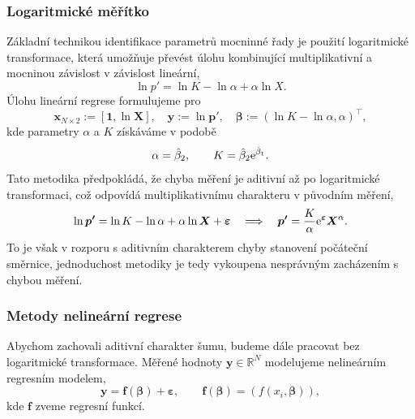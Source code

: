 \subsubsection{Logaritmické měřítko}\label{sss:logaritmicke_meritko}
Základní technikou identifikace parametrů mocninné řady je použití logaritmické transformace, která umožňuje převést úlohu kombinující multiplikativní a mocninou závislost v závislost lineární,
\begin{equation}
    \ln{p'}=\ln{K}-\ln{\alpha}+\alpha \ln{X}.
\end{equation}
Úlohu lineární regrese formulujeme pro
\begin{equation}
    \bm{x}_{N\times2}:=[\bm{1},\ln{\bm{X}}],\quad \bm{y}:=\ln{\bm{p'}},\quad \bm{\beta}:=(\ln{K}-\ln{\alpha}, \alpha)^\top,
\end{equation}
kde parametry $\alpha$ a $K$ získáváme v podobě
\begin{equation}
    \alpha=\hat{\beta}_2,\qquad K=\hat{\beta}_2 \mathrm{e}^{\hat{\beta}_1}.
\end{equation}
Tato metodika předpokládá, že chyba měření je aditivní až po logaritmické transformaci, což odpovídá multiplikativnímu charakteru v původním měření,
\begin{equation}
    \ln\bm{p'}=\ln{K}-\ln{\alpha}+\alpha \ln{\bm{X}}+\bm{\varepsilon} \quad \Longrightarrow \quad \bm{p'}=\frac{K}{\alpha}\mathrm{e}^{\bm{\varepsilon}}\bm{X}^{\alpha}.
\end{equation}
To je však v rozporu s aditivním charakterem chyby stanovení počáteční směrnice, jednoduchost metodiky je tedy vykoupena nesprávným zacházením s chybou měření. 

\subsubsection{Metody nelineární regrese}\label{sss:metody_nelinearni_regrese}
Abychom zachovali aditivní charakter šumu, budeme dále pracovat bez logaritmické transformace. Měřené hodnoty $\bm{y}\in\mathbb{R}^N$ modelujeme nelineárním regresním modelem,
\begin{equation}
    \bm{y}=\bm{f}(\bm{\beta})+\bm{\varepsilon},\qquad \bm{f}(\bm{\beta})=(f(x_i,\bm{\beta})),
\end{equation}
kde $\bm{f}$ zveme regresní funkcí. 

